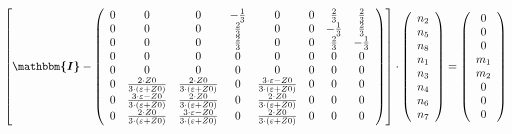 \[ \left[ \boldsymbol{\mathbbm{I}}  - \left(\begin{array}{cccccccc} 0
& 0 & 0 & -\frac{1}{3} & 0 & 0 & \frac{2}{3} & \frac{2}{3} \\ 0 & 0 &
0 & \frac{2}{3} & 0 & 0 & -\frac{1}{3} & \frac{2}{3} \\ 0 & 0 & 0 &
\frac{2}{3} & 0 & 0 & \frac{2}{3} & -\frac{1}{3} \\ 0 & 0 & 0 & 0 & 0
& 0 & 0 & 0 \\ 0 & 0 & 0 & 0 & 0 & 0 & 0 & 0 \\ 0 & \frac{2\cdot
Z0}{3\cdot \left(\varepsilon+Z0\right)} & \frac{2\cdot Z0}{3\cdot
\left(\varepsilon+Z0\right)} & 0 & \frac{3\cdot \varepsilon-Z0}{3\cdot
\left(\varepsilon+Z0\right)} & 0 & 0 & 0 \\ 0 & \frac{3\cdot
\varepsilon-Z0}{3\cdot \left(\varepsilon+Z0\right)} & \frac{2\cdot
Z0}{3\cdot \left(\varepsilon+Z0\right)} & 0 & \frac{2\cdot Z0}{3\cdot
\left(\varepsilon+Z0\right)} & 0 & 0 & 0 \\ 0 & \frac{2\cdot
Z0}{3\cdot \left(\varepsilon+Z0\right)} & \frac{3\cdot
\varepsilon-Z0}{3\cdot \left(\varepsilon+Z0\right)} & 0 & \frac{2\cdot
Z0}{3\cdot \left(\varepsilon+Z0\right)} & 0 & 0 & 0
\end{array}\right)\right] \cdot \left(\begin{array}{c} n_{2} \\ n_{5}
\\ n_{8} \\ n_{1} \\ n_{3} \\ n_{4} \\ n_{6} \\ n_{7}
\end{array}\right) = \left(\begin{array}{c} 0 \\ 0 \\ 0 \\ m_{1} \\
m_{2} \\ 0 \\ 0 \\ 0 \end{array}\right) \]
